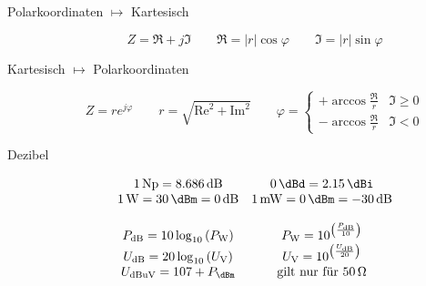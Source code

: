 \begin{description}
\item[Polarkoordinaten $\longmapsto$ Kartesisch]
\begin{equation*}
Z = \Re + j\Im \qquad \Re = |r| \cos \varphi \qquad \Im = |r| \sin \varphi
\end{equation*}

\item[Kartesisch $\longmapsto$ Polarkoordinaten]
\begin{equation*}
Z = r e^{j \varphi} \qquad r = \sqrt{\text{Re}^2 + \text{Im}^2} \qquad \varphi = \left\{ \begin{array}{cc}
+\arccos \frac{\Re}{r} & \Im \geq 0 \\ 
-\arccos \frac{\Re}{r} & \Im < 0
\end{array} \right.
\end{equation*}

\item[Dezibel]
\begin{equation*}
\begin{array}{cc}
\SI{1}{\neper} = \SI{8,686}{\dB} & \SI{0}{\dBd} = \SI{2,15}{\dBi} \\ 
\SI{1}{\watt} = \SI{30}{\dBm} = \SI{0}{\dB} & \SI{1}{\milli\watt} = \SI{0}{\dBm} = \SI{-30}{\dB} \\
 & \\
P_{\si{\dB}} = 10\log_{10}\left( P_{\si{\watt}} \right) & P_{\si{\watt}} = 10^{\left( \frac{P_{\si{\dB}}}{10} \right)} \\
U_{\si{\dB}} = 20\log_{10}\left( U_{\si{\volt}} \right) & U_{\si{\volt}} = 10^{\left( \frac{U_{\si{\dB}}}{20} \right)} \\
U_{\si{dBuV}} = 107 + P_{\si{\dBm}} & \text{gilt nur für \SI{50}{\ohm}}
\end{array}
\end{equation*}


\end{description}
